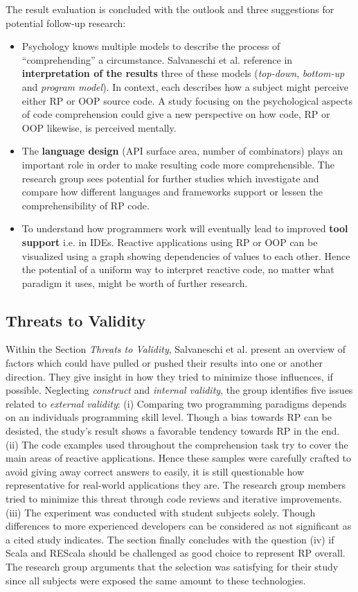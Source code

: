 \documentclass[12pt,a4paper]{article}
\begin{document}
The result evaluation is concluded with the outlook and three suggestions for potential follow-up research:

\begin{itemize}
	\item Psychology knows multiple models to describe the process of ``comprehending'' a circumstance. Salvaneschi et al. reference in \textbf{interpretation of the results} three of these models (\emph{top-down}, \emph{bottom-up} and \emph{program model}). In context, each describes how a subject might perceive either RP or OOP source code. A study focusing on the psychological aspects of code comprehension could give a new perspective on how code, RP or OOP likewise, is perceived mentally.
	\item The \textbf{language design} (API surface area, number of combinators) plays an important role in order to make resulting code more comprehensible. The research group sees potential for further studies which investigate and compare how different languages and frameworks support or lessen the comprehensibility of RP code.
	\item To understand how programmers work will eventually lead to improved \textbf{tool support} i.e. in IDEs. Reactive applications using RP or OOP can be visualized using a graph showing dependencies of values to each other. Hence the potential of a uniform way to interpret reactive code, no matter what paradigm it uses, might be worth of further research.
\end{itemize}

\subsection{Threats to Validity}

Within the Section \emph{Threats to Validity}, Salvaneschi et al. present an overview of factors which could have pulled or pushed their results into one or another direction. They give insight in how they tried to minimize those influences, if possible. Neglecting \emph{construct} and \emph{internal validity}, the group identifies five issues related to \emph{external validity}: (i) Comparing two programming paradigms depends on an individuals programming skill level. Though a bias towards RP can be desisted, the study's result shows a favorable tendency towards RP in the end. (ii) The code examples used throughout the comprehension task try to cover the main areas of reactive applications. Hence these samples were carefully crafted to avoid giving away correct answers to easily, it is still questionable how representative for real-world applications they are. The research group members tried to minimize this threat through code reviews and iterative improvements. (iii) The experiment was conducted with student subjects solely. Though differences to more experienced developers can be considered as not significant as a cited study \cite{DiPenta} indicates. The section finally concludes with the question (iv) if Scala and REScala should be challenged as good choice to represent RP overall. The research group arguments that the selection was satisfying for their study since all subjects were exposed the same amount to these technologies.
\end{document}
